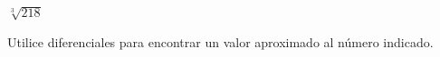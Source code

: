 \item $\sqrt[3]{218}$
\par
Utilice diferenciales para encontrar un valor aproximado al número indicado.
